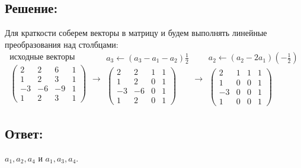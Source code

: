 \documentclass[12pt]{article}
\begin{document}
    \subsection*{Решение:}
    Для краткости соберем векторы в матрицу и будем выполнять линейные преобразования над столбцами:
    \[
        \begin{array}{c}
            \text{исходные векторы} \\
            \begin{pmatrix}
                2  & 2  & 6  & 1 \\
                1  & 2  & 3  & 1 \\
                -3 & -6 & -9 & 1 \\
                1  & 2  & 3  & 1
            \end{pmatrix}
        \end{array}
        \rightarrow
        \begin{array}{c}
            a_3 \leftarrow \left ( a_3 - a_1 - a_2 \right ) \frac{1}{2} \\
            \begin{pmatrix}
                2  & 2  & 1 & 1 \\
                1  & 2  & 0 & 1 \\
                -3 & -6 & 0 & 1 \\
                1  & 2  & 0 & 1
            \end{pmatrix}
        \end{array}
        \rightarrow
        \begin{array}{c}
            a_2 \leftarrow \left ( a_2 - 2 a_1 \right ) \left ( - \frac{1}{2} \right ) \\
            \begin{pmatrix}
                2  & 1 & 1 & 1 \\
                1  & 0 & 0 & 1 \\
                -3 & 0 & 0 & 1 \\
                1  & 0 & 0 & 1
            \end{pmatrix}
        \end{array}
    \]

    \subsection*{Ответ:}
    $a_1, a_2, a_4$ и $a_1, a_3, a_4$.
\end{document}
